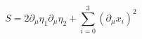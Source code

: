\begin{equation}
S=2\partial_\mu\eta_1\partial_\mu\eta_2+\sum_{i=0}^3 (\partial_\mu x_i)^2\label{eqII}
\end{equation}


